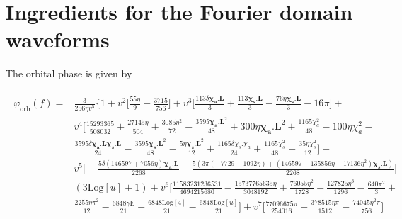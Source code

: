 \documentclass[prd,preprintnumbers,twocolumn,eqsecnum,floatfix,letter]{revtex4}
\begin{document}
\section{Ingredients for the Fourier domain waveforms}
The orbital phase is given by 
\begin{widetext}
\begin{align}
\begin{split}
\varphi_\mathrm{orb}(f) = &\frac{3}{256\eta v^{5}}\Bigg\lbrace 1 + v^{2}\Bigg\lbrack\frac{55\eta}{9}+\frac{3715}{756}\Bigg\rbrack + v^{3}\Bigg\lbrack\frac{113\delta\boldsymbol{\chi_{a}.L}}{3} +\frac{113\boldsymbol{\chi_{s}.L}}{3} - \frac{76\eta\boldsymbol{\chi_{s}.L}}{3} -16\pi\Bigg\rbrack + \\& v^{4}\Bigg\lbrack\frac{15293365}{508032}+\frac{27145 \eta }{504}+\frac{3085 \eta ^2}{72}-\frac{3595 \boldsymbol{\chi_{a}.L}^2}{48}+300 \eta  \boldsymbol{\chi_{a}.L}^2+\frac{1165 \chi_{a}^{2}}{48}- 100 \eta  \chi_{a}^{2}-\\& \frac{3595 \delta  \boldsymbol{\chi_{a}.L} \boldsymbol{\chi_{s}.L}}{24}-\frac{3595 \boldsymbol{\chi_{s}.L}^2}{48}-\frac{5 \eta  \boldsymbol{\chi_{s}.L}^2}{12}+\frac{1165 \delta  \chi_{s}.\chi_{a}}{24}+\frac{1165 \chi_{s}^{2}}{48}+\frac{35 \eta \chi _{s}^{2}}{12}\Bigg\rbrack + \\& v^{5}\Bigg\lbrack
-\frac{5 \delta  (146597+7056 \eta ) \boldsymbol{\chi_{a}.L}}{2268}-\frac{5 \left(3 \pi  (-7729+1092 \eta )+\left(146597-135856 \eta -17136 \eta ^2\right) \boldsymbol{\chi_{s}.L}\right)}{2268}\Bigg\rbrack \\&(3 \text{Log}[u]+1) +
v^{6}\Bigg\lbrack \frac{11583231236531}{4694215680}-\frac{15737765635 \eta}{3048192}+\frac{76055 \eta^2}{1728}-\frac{127825 \eta^3}{1296}-\frac{640 \pi ^2}{3}+\\&\frac{2255 \eta \pi ^2}{12}- \frac{6848 \text{$\gamma $E}}{21}-\frac{6848 \text{Log}[4]}{21}-\frac{6848 \text{Log}[u]}{21}\Bigg\rbrack + v^{7}\Bigg\lbrack\frac{77096675 \pi }{254016}+\frac{378515 \eta \pi }{1512}-\frac{74045 \eta^2 \pi }{756}\Bigg\rbrack
\end{split}
\label{eqn:fphase}
\end{align}
\end{widetext}


\end{document}
